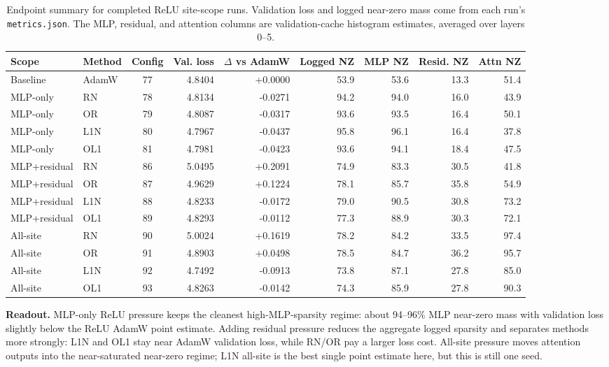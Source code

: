 \documentclass[10pt]{article}
\newcommand{\code}[1]{\texttt{#1}}
\newcommand{\pct}{\%}
\begin{document}
\begin{table}[H]
\centering
\caption{Endpoint summary for completed ReLU site-scope runs. Validation loss and logged near-zero mass come from each run's \code{metrics.json}. The MLP, residual, and attention columns are validation-cache histogram estimates, averaged over layers 0--5.}
\small
\begin{tabular}{llcrrrrrr}
\toprule
Scope & Method & Config & Val. loss & \(\Delta\) vs AdamW & Logged NZ & MLP NZ & Resid. NZ & Attn NZ \\
\midrule
Baseline & AdamW & 77 & 4.8404 & +0.0000 & 53.9 & 53.6 & 13.3 & 51.4 \\
MLP-only & RN & 78 & 4.8134 & -0.0271 & 94.2 & 94.0 & 16.0 & 43.9 \\
MLP-only & OR & 79 & 4.8087 & -0.0317 & 93.6 & 93.5 & 16.4 & 50.1 \\
MLP-only & L1N & 80 & 4.7967 & -0.0437 & 95.8 & 96.1 & 16.4 & 37.8 \\
MLP-only & OL1 & 81 & 4.7981 & -0.0423 & 93.6 & 94.1 & 18.4 & 47.5 \\
MLP+residual & RN & 86 & 5.0495 & +0.2091 & 74.9 & 83.3 & 30.5 & 41.8 \\
MLP+residual & OR & 87 & 4.9629 & +0.1224 & 78.1 & 85.7 & 35.8 & 54.9 \\
MLP+residual & L1N & 88 & 4.8233 & -0.0172 & 79.0 & 90.5 & 30.8 & 73.2 \\
MLP+residual & OL1 & 89 & 4.8293 & -0.0112 & 77.3 & 88.9 & 30.3 & 72.1 \\
All-site & RN & 90 & 5.0024 & +0.1619 & 78.2 & 84.2 & 33.5 & 97.4 \\
All-site & OR & 91 & 4.8903 & +0.0498 & 78.5 & 84.7 & 36.2 & 95.7 \\
All-site & L1N & 92 & 4.7492 & -0.0913 & 73.8 & 87.1 & 27.8 & 85.0 \\
All-site & OL1 & 93 & 4.8263 & -0.0142 & 74.3 & 85.9 & 27.8 & 90.3 \\
\bottomrule
\end{tabular}
\end{table}

\textbf{Readout.} MLP-only ReLU pressure keeps the cleanest high-MLP-sparsity regime: about 94--96\pct{} MLP near-zero mass with validation loss slightly below the ReLU AdamW point estimate. Adding residual pressure reduces the aggregate logged sparsity and separates methods more strongly: L1N and OL1 stay near AdamW validation loss, while RN/OR pay a larger loss cost. All-site pressure moves attention outputs into the near-saturated near-zero regime; L1N all-site is the best single point estimate here, but this is still one seed.
\end{document}

